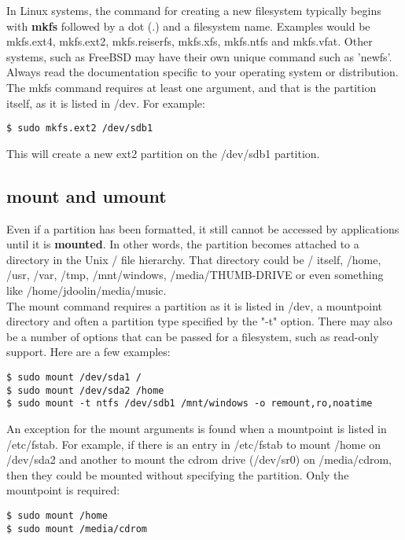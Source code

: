 In Linux systems, the command for creating a new filesystem typically begins with \textbf{mkfs} followed by a dot (.) and a filesystem name.  Examples would be mkfs.ext4, mkfs.ext2, mkfs.reiserfs, mkfs.xfs, mkfs.ntfs and mkfs.vfat.  Other systems, such as FreeBSD may have their own unique command such as 'newfs'.  Always read the documentation specific to your operating system or distribution.\\

The mkfs command requires at least one argument, and that is the partition itself, as it is listed in /dev.  For example:

\begin{verbatim}
$ sudo mkfs.ext2 /dev/sdb1
\end{verbatim}

This will create a new ext2 partition on the /dev/sdb1 partition.

\subsection{mount and umount}

Even if a partition has been formatted, it still cannot be accessed by applications until it is \textbf{mounted}.  In other words, the partition becomes attached to a directory in the Unix / file hierarchy.  That directory could be / itself, /home, /usr, /var, /tmp, /mnt/windows, /media/THUMB-DRIVE or even something like /home/jdoolin/media/music.\\

The mount command requires a partition as it is listed in /dev, a mountpoint directory and often a partition type specified by the "-t" option.  There may also be a number of options that can be passed for a filesystem, such as read-only support.  Here are a few examples:

\begin{verbatim}
$ sudo mount /dev/sda1 /
$ sudo mount /dev/sda2 /home
$ sudo mount -t ntfs /dev/sdb1 /mnt/windows -o remount,ro,noatime
\end{verbatim}

An exception for the mount arguments is found when a mountpoint is listed in /etc/fstab.  For example, if there is an entry in /etc/fstab to mount /home on /dev/sda2 and another to mount the cdrom drive (/dev/sr0) on /media/cdrom, then they could be mounted without specifying the partition.  Only the mountpoint is required:

\begin{verbatim}
$ sudo mount /home
$ sudo mount /media/cdrom
\end{verbatim}

